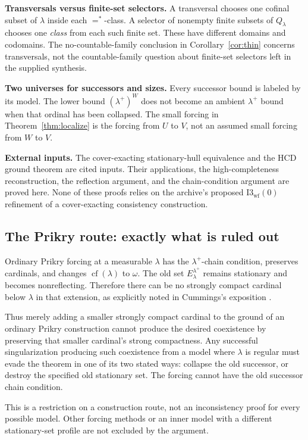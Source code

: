 \documentclass[11pt,letterpaper]{article}
\theoremstyle{definition}
\numberwithin{equation}{section}
\newcommand{\cf}{\operatorname{cf}}
\newcommand{\Iwf}{\mathrm{I3}_{\mathrm{wf}}(0)}
\begin{document}
\textbf{Transversals versus finite-set selectors.} A transversal chooses one cofinal subset of $\lambda$ inside each $=^*$-class. A selector of nonempty finite subsets of $Q_\lambda$ chooses one \emph{class} from each such finite set. These have different domains and codomains. The no-countable-family conclusion in Corollary~\ref{cor:thin} concerns transversals, not the countable-family question about finite-set selectors left in the supplied synthesis.

\textbf{Two universes for successors and sizes.} Every successor bound is labeled by its model. The lower bound $(\lambda^+)^W$ does not become an ambient $\lambda^+$ bound when that ordinal has been collapsed. The small forcing in Theorem~\ref{thm:localize} is the forcing from $U$ to $V$, not an assumed small forcing from $W$ to $V$.

\textbf{External inputs.} The cover-exacting stationary-hull equivalence and the HCD ground theorem are cited inputs. Their applications, the high-completeness reconstruction, the reflection argument, and the chain-condition argument are proved here. None of these proofs relies on the archive's proposed $\Iwf$ refinement of a cover-exacting consistency construction.

\subsection{The Prikry route: exactly what is ruled out}

Ordinary Prikry forcing at a measurable $\lambda$ has the $\lambda^+$-chain condition, preserves cardinals, and changes $\cf(\lambda)$ to $\omega$. The old set $E^{\lambda^+}_\lambda$ remains stationary and becomes nonreflecting. Therefore there can be no strongly compact cardinal below $\lambda$ in that extension, as explicitly noted in Cummings's exposition \cite{cummings}.

Thus merely adding a smaller strongly compact cardinal to the ground of an ordinary Prikry construction cannot produce the desired coexistence by preserving that smaller cardinal's strong compactness. Any successful singularization producing such coexistence from a model where $\lambda$ is regular must evade the theorem in one of its two stated ways: collapse the old successor, or destroy the specified old stationary set. The forcing cannot have the old successor chain condition.

This is a restriction on a construction route, not an inconsistency proof for every possible model. Other forcing methods or an inner model with a different stationary-set profile are not excluded by the argument.
\end{document}
